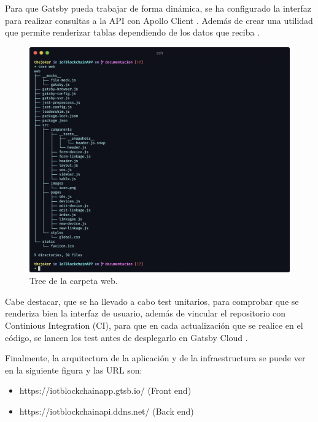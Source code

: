 \noindent Para que Gatsby pueda trabajar de forma dinámica, se ha configurado la interfaz para realizar consultas
a la API con Apollo Client \cite{setup-apollo-gatsby}. Además de crear una utilidad que permite renderizar tablas 
dependiendo de los datos que reciba \cite{dynamic-table}.

\begin{figure}[ht!]
  \centering
  \includegraphics[width=\textwidth]{imagenes/desarrollo/tree_web}
  \caption{Tree de la carpeta web.}
  \label{fig:tree-web}
\end{figure}

\vspace{5mm}

\noindent Cabe destacar, que se ha llevado a cabo test unitarios, para comprobar que se renderiza bien la interfaz de 
usuario, además de vincular el repositorio con Continious Integration (CI), para que en cada actualización que se realice 
en el código, se lancen los test antes de desplegarlo en Gatsby Cloud \cite{unit-test, travis-ci-nodejs}.

\vspace{5mm}

\noindent Finalmente, la arquitectura de la aplicación y de la infraestructura se puede ver en la siguiente figura
y las URL son: 

\begin{itemize}
  \item https://iotblockchainapp.gtsb.io/ (Front end)
  \item https://iotblockchainapi.ddns.net/ (Back end)
\end{itemize}

